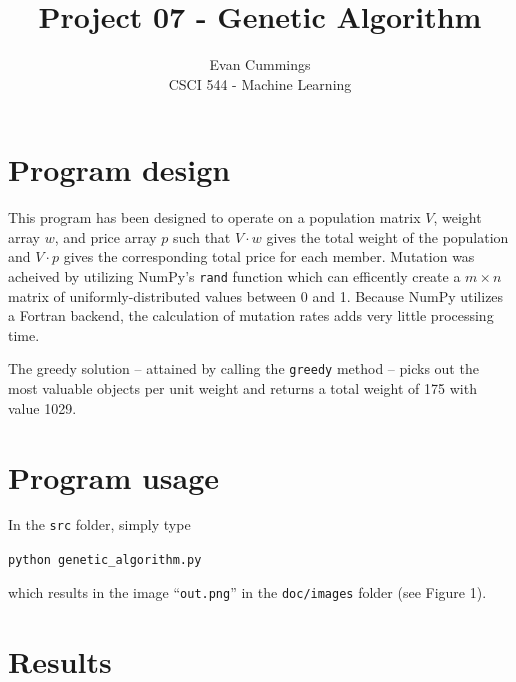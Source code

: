 
\DeclareMathOperator*{\argmax}{arg\,max}

\usepackage[top=.1in, bottom=1in, left=.5in, right=.5in]{geometry}
\usepackage{framed}
\setlength{\columnsep}{8mm}



\footnotesize
\title{Project 07 - Genetic Algorithm}
\author{Evan Cummings\\
CSCI 544 - Machine Learning}

\maketitle

\section{Program design}

This program has been designed to operate on a population matrix $V$, weight array $w$, and price array $p$ such that $V \cdot w$ gives the total weight of the population and $V \cdot p$ gives the corresponding total price for each member.  Mutation was acheived by utilizing NumPy's \texttt{rand} function which can efficently create a $m \times n$ matrix of uniformly-distributed values between 0 and 1.  Because NumPy utilizes a Fortran backend, the calculation of mutation rates adds very little processing time.

The greedy solution -- attained by calling the \texttt{greedy} method -- picks out the most valuable objects per unit weight and returns a total weight of 175 with value 1029.

\section{Program usage}

In the \texttt{src} folder, simply type

\vspace{2mm}
\centerline{\texttt{python genetic\_algorithm.py}}

\vspace{2mm}
\noindent which results in the image ``\texttt{out.png}'' in the \texttt{doc/images} folder (see Figure 1).

\section{Results}

